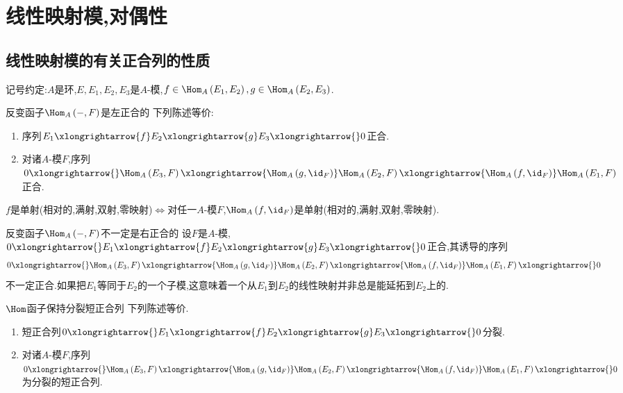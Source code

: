 \chapter{线性映射模,对偶性}

\section{线性映射模的有关正合列的性质}

记号约定:$A$是环,$E,E_{1},E_{2},E_{3}$是$A$-模,$f\in\Hom_{A}\left(E_{1},E_{2}\right),g\in\Hom_{A}\left(E_{2},E_{3}\right)$.

\begin{proposition}{反变函子$\Hom_{A}\left(-,F\right)$是左正合的}{}
	下列陈述等价:
	\begin{enumerate}
		\item 序列$E_{1}\xlongrightarrow{f}E_{2}\xlongrightarrow{g}E_{3}\xlongrightarrow{}0$正合.
		\item 对诸$A$-模$F$,序列$0\xlongrightarrow{}\Hom_{A}\left(E_{3},F\right)\xlongrightarrow{\Hom_{A}\left(g,\id_{F}\right)}\Hom_{A}\left(E_{2},F\right)\xlongrightarrow{\Hom_{A}\left(f,\id_{F}\right)}\Hom_{A}\left(E_{1},F\right)$正合.
	\end{enumerate}
\end{proposition}

\begin{corollary}{}{}
	$f$是单射(相对的,满射,双射,零映射)$\iff$对任一$A$-模$F$,$\Hom_{A}\left(f,\id_{F}\right)$是单射(相对的,满射,双射,零映射).
\end{corollary}

\begin{remark}{反变函子$\Hom_{A}\left(-,F\right)$不一定是右正合的}{}
	设$F$是$A$-模,$0\xlongrightarrow{}E_{1}\xlongrightarrow{f}E_{2}\xlongrightarrow{g}E_{3}\xlongrightarrow{}0$正合,其诱导的序列
	\begin{align*}
		0\xlongrightarrow{}\Hom_{A}\left(E_{3},F\right)\xlongrightarrow{\Hom_{A}\left(g,\id_{F}\right)}\Hom_{A}\left(E_{2},F\right)\xlongrightarrow{\Hom_{A}\left(f,\id_{F}\right)}\Hom_{A}\left(E_{1},F\right)\xlongrightarrow{}0
	\end{align*}
	不一定正合.如果把$E_{1}$等同于$E_{2}$的一个子模,这意味着一个从$E_{1}$到$E_{2}$的线性映射并非总是能延拓到$E_{2}$上的.
\end{remark}

\begin{proposition}{$\Hom$函子保持分裂短正合列}{}
	下列陈述等价.
	\begin{enumerate}
		\item 短正合列$0\xlongrightarrow{}E_{1}\xlongrightarrow{f}E_{2}\xlongrightarrow{g}E_{3}\xlongrightarrow{}0$分裂.
		\item 对诸$A$-模$F$,序列$0\xlongrightarrow{}\Hom_{A}\left(E_{3},F\right)\xlongrightarrow{\Hom_{A}\left(g,\id_{F}\right)}\Hom_{A}\left(E_{2},F\right)\xlongrightarrow{\Hom_{A}\left(f,\id_{F}\right)}\Hom_{A}\left(E_{1},F\right)\xlongrightarrow{}0$为分裂的短正合列.
	\end{enumerate}
\end{proposition}

